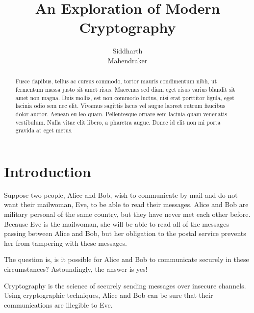 \documentclass[12pt, a4paper, draft]{report}
\begin{document}
\title{An Exploration of Modern Cryptography}
\author{Siddharth\\
        Mahendraker}
\maketitle

\begin{abstract}
Fusce dapibus, tellus ac cursus commodo, tortor mauris condimentum nibh,
ut fermentum massa justo sit amet risus. Maecenas sed diam eget risus
varius blandit sit amet non magna. Duis mollis, est non commodo luctus,
nisi erat porttitor ligula, eget lacinia odio sem nec elit. Vivamus
sagittis lacus vel augue laoreet rutrum faucibus dolor auctor. Aenean
eu leo quam. Pellentesque ornare sem lacinia quam venenatis vestibulum.
Nulla vitae elit libero, a pharetra augue. Donec id elit non mi porta
gravida at eget metus.
\end{abstract}

\setcounter{secnumdepth}{3}
\renewcommand*\thesection{\arabic{section}}
\renewcommand{\cftsecfont}{\bfseries}

\setcounter{page}{1}
\tableofcontents
\clearpage
{}
\setcounter{page}{1}

\section*{Introduction}

Suppose two people, Alice and Bob, wish to communicate by mail and do not
want their mailwoman, Eve, to be able to read their messages. Alice and Bob
are military personal of the same country, but they have never met each
other before. Because Eve is the mailwoman, she will be able to read
all of the messages passing between Alice and Bob, but her obligation to
the postal service prevents her from tampering with these
messages\footnotemark.


The question is, is it possible for Alice and Bob to communicate securely
in these circumstances? Astoundingly, the answer is yes!

Cryptography is the science of securely sending messages over insecure
channels. Using cryptographic techniques, Alice and Bob can be sure that
their communications are illegible to Eve.
\end{document}
